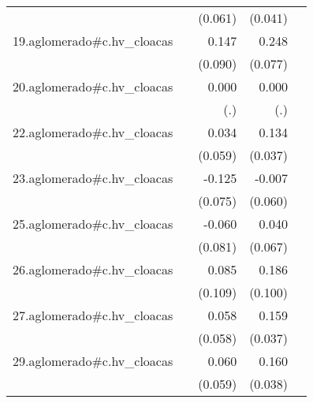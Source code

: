 {\begin{longtable}{l*{4}{D{.}{.}{-1}}}
            &                     &     (0.061)         &     (0.041)         &                     \\
\addlinespace
19.aglomerado#c.hv\_cloacas&                     &       0.147         &       0.248\sym{**} &                     \\
            &                     &     (0.090)         &     (0.077)         &                     \\
\addlinespace
20.aglomerado#c.hv\_cloacas&                     &       0.000         &       0.000         &                     \\
            &                     &         (.)         &         (.)         &                     \\
\addlinespace
22.aglomerado#c.hv\_cloacas&                     &       0.034         &       0.134\sym{***}&                     \\
            &                     &     (0.059)         &     (0.037)         &                     \\
\addlinespace
23.aglomerado#c.hv\_cloacas&                     &      -0.125         &      -0.007         &                     \\
            &                     &     (0.075)         &     (0.060)         &                     \\
\addlinespace
25.aglomerado#c.hv\_cloacas&                     &      -0.060         &       0.040         &                     \\
            &                     &     (0.081)         &     (0.067)         &                     \\
\addlinespace
26.aglomerado#c.hv\_cloacas&                     &       0.085         &       0.186         &                     \\
            &                     &     (0.109)         &     (0.100)         &                     \\
\addlinespace
27.aglomerado#c.hv\_cloacas&                     &       0.058         &       0.159\sym{***}&                     \\
            &                     &     (0.058)         &     (0.037)         &                     \\
\addlinespace
29.aglomerado#c.hv\_cloacas&                     &       0.060         &       0.160\sym{***}&                     \\
            &                     &     (0.059)         &     (0.038)         &                     \\

\end{longtable}}

